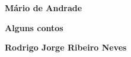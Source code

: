 \textbf{Mário de Andrade} \lipsum[1]

\textbf{Alguns contos} \lipsum[2]

\textbf{Rodrigo Jorge Ribeiro Neves} \lipsum[3]







